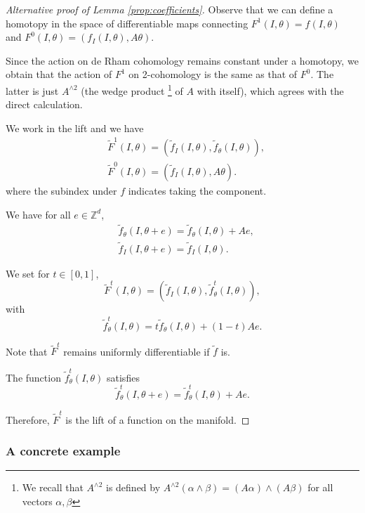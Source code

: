 \documentclass[11pt]{amsart}
\theoremstyle{definition}
\theoremstyle{remark}
\numberwithin{equation}{section}
\newcommand{\Z}{\mathbb Z}
\begin{document}
\begin{proof}[Alternative proof of Lemma \ref{prop:coefficients}]
  Observe that we can define a homotopy
  in the space of differentiable maps
  connecting $F^1(I,\theta) = f(I,\theta)$
  and $F^0(I,\theta) = (f_I (I, \theta), A \theta)$.

  Since the action on de Rham cohomology remains constant
  under a homotopy, we obtain that the action of $F^1$ on 2-cohomology
  is the same as that of $F^0$. The latter is just $A^{\wedge 2}$
 (the  wedge product \footnote{We recall that $A^{\wedge 2}$ is defined by
  $A^{\wedge 2}(\alpha \wedge \beta) = (A \alpha) \wedge (A \beta)$ for all
  vectors $\alpha, \beta$} of $A$  with itself),
  which agrees with the direct calculation.



  We work in the lift and we have
  \[
  \begin{split}
    &\tilde F^1(I,\theta)= (\tilde f_I(I,\theta), \tilde f_\theta(I, \theta) ) ,\\
    &\tilde F^0(I,\theta) = (\tilde f_I(I,\theta), A \theta) .
  \end{split}
  \]
  where the subindex  under $f$ indicates taking the component.


  We have for all $e \in \Z^d$,
  \[
  \begin{split}
    & \tilde f_\theta(I, \theta + e) =
    \tilde f_\theta(I, \theta) + Ae ,\\
    & \tilde f_I(I, \theta + e) = \tilde f_I(I, \theta) .
  \end{split}
  \]

  We set for $t \in [0,1]$,
  \[
  \tilde F^t(I,\theta) = (\tilde f_I(I,\theta),  \tilde f^t_\theta (I,\theta)) ,
  \]
  with
  \[
  \tilde f^t_\theta(I, \theta) = t \tilde f_\theta (I,\theta) + (1-t)A e .
  \]

  Note that $\tilde F^t$ remains uniformly differentiable if $\tilde f$ is.

  The function $  \tilde f^t_\theta(I, \theta)$ satisfies
  \[
  \tilde f^t_\theta(I, \theta + e ) =
  \tilde f^t_\theta(I, \theta) + Ae .
  \]

  Therefore, $\tilde F^t$ is the lift of a function on the manifold.
  \end{proof}


\subsubsection{A concrete example}
\end{document}
